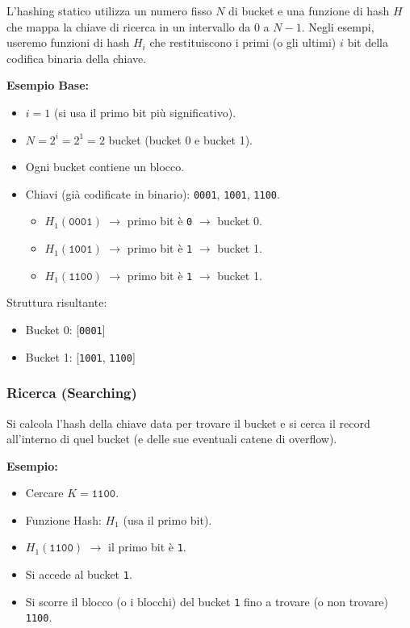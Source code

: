 L'hashing statico utilizza un numero fisso $N$ di bucket e una funzione di hash $H$ che mappa la chiave di ricerca in un intervallo da 0 a $N-1$.
Negli esempi, useremo funzioni di hash $H_i$ che restituiscono i primi (o gli ultimi) $i$ bit della codifica binaria della chiave.

\textbf{Esempio Base:}
\begin{itemize}
    \item $i = 1$ (si usa il primo bit più significativo).
    \item $N = 2^i = 2^1 = 2$ bucket (bucket 0 e bucket 1).
    \item Ogni bucket contiene un blocco.
    \item Chiavi (già codificate in binario): \texttt{0001}, \texttt{1001}, \texttt{1100}.
    \begin{itemize}
        \item $H_1(\texttt{0001})$ $\rightarrow$ primo bit è \texttt{0} $\rightarrow$ bucket 0.
        \item $H_1(\texttt{1001})$ $\rightarrow$ primo bit è \texttt{1} $\rightarrow$ bucket 1.
        \item $H_1(\texttt{1100})$ $\rightarrow$ primo bit è \texttt{1} $\rightarrow$ bucket 1.
    \end{itemize}
\end{itemize}

Struttura risultante:
\begin{itemize}
    \item Bucket 0: [\texttt{0001}]
    \item Bucket 1: [\texttt{1001}, \texttt{1100}]
\end{itemize}

\subsubsection{Ricerca (Searching)}
Si calcola l'hash della chiave data per trovare il bucket e si cerca il record all'interno di quel bucket (e delle sue eventuali catene di overflow).

\textbf{Esempio:}
\begin{itemize}
    \item Cercare $K = \texttt{1100}$.
    \item Funzione Hash: $H_1$ (usa il primo bit).
    \item $H_1(\texttt{1100})$ $\rightarrow$ il primo bit è \texttt{1}.
    \item Si accede al bucket \texttt{1}.
    \item Si scorre il blocco (o i blocchi) del bucket \texttt{1} fino a trovare (o non trovare) \texttt{1100}.
\end{itemize}

